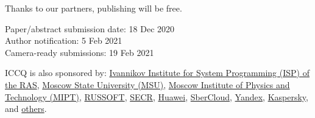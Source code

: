 \documentclass{../cfp}
\begin{document}
Thanks to our partners, publishing will be free.

\vspace{6pt}

Paper/abstract submission date: 18 Dec 2020 \\
Author notification: 5 Feb 2021 \\
Camera-ready submissions: 19 Feb 2021

\vspace{6pt}

\begin{adjustwidth}{0pt}{1in}
ICCQ is also sponsored by:
\href{https://www.ispras.ru/en/}{Ivannikov Institute for System Programming (ISP) of the RAS},
\href{https://www.msu.ru/}{Moscow State University (MSU)},
\href{https://mipt.ru/english/}{Moscow Institute of Physics and Technology (MIPT)},
\href{https://russoft.org/en/}{RUSSOFT},
\href{https://2021.secrus.org/?lang=en}{SECR},
\href{https://www.huawei.com}{Huawei},
\href{https://sbercloud.ru/}{SberCloud},
\href{https://yandex.ru/}{Yandex},
\href{https://www.kaspersky.com/}{Kaspersky},
and \href{https://www.iccq.ru/#partners}{others}.
\end{adjustwidth}
\end{document}
